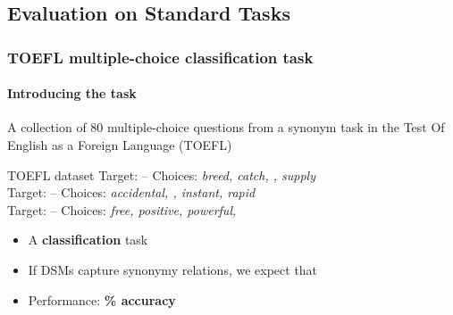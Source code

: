 \documentclass[t]{beamer} %
\begin{document}
\subsection{Evaluation on Standard Tasks}

\begin{frame}
  \frametitle{TOEFL multiple-choice classification task}
  \framesubtitle{Introducing the task}

  A collection of 80 multiple-choice questions from a synonym task in the Test Of English as a Foreign Language (TOEFL) 
  \begin{exampleblock}{TOEFL dataset}
    Target:  -- Choices: \emph{breed, catch, , supply} \\
    Target:  -- Choices:  \emph{accidental, , instant, rapid}  \\
    Target: \hspace{1ex} -- Choices: \emph{free, positive, powerful, } \\
  \end{exampleblock}
  \begin{itemize}
  \item A \textbf{classification} task
  \item If DSMs capture synonymy relations, we expect that 
  \item Performance: \textbf{\% accuracy}
  \end{itemize}

  
\end{frame}
\end{document}
